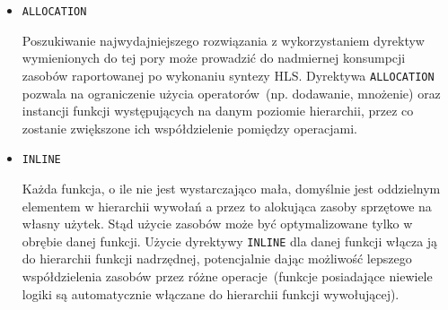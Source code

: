 \begin{itemize}
\begin{lstlisting}[caption=Ilustracja problemu związanego z wykrywaniem zależności przez Vivado HLS i wpływu na wydajność]
while(true)
{
#pragma HLS PIPELINE
	...
	switch(inst)
	{
		case ADD:
			reg = reg + 1;
			break;
		case NEG:
			reg = -reg;
			break;
		case SQRT:
			reg = sqrt(reg);
			break;
		default:
			break;
	}
}
\end{lstlisting}
W powyższym przykładzie HLS dokonując analizy zależności pomiędzy wykorzystaniem \texttt{reg} założy konserwatywnie, że interwał przetwarzania instrukcji będzie określony poprzez instrukcję wykonującą się najdłużej~(tutaj jest to funkcja \texttt{sqrt()}), gdyż tylko wtedy istnieje pewność, że moduł będzie wykonywał się w sposób poprawny. Prowadzi to do sytuacji, że nawet instrukcja pusta~(realizowana przez \texttt{default}) będzie wykonywana tak długo jak \texttt{sqrt()}, co w jawny sposób ogranicza szybkość przetwarzania. Dyrektywa \texttt{DEPENDENCE} w założeniu pozwoli wymusić, by rozważanie zależności zostało w przypadku zmiennej \texttt{reg} pominięte\footnote{Stosując tę dyrektywę należy mieć pewność, że nie narusza to integralności algorytmu albo projektant jest w stanie poradzić sobie z ubocznymi konsekwencjami jej użycia.}.

\item \texttt{ALLOCATION}

Poszukiwanie najwydajniejszego rozwiązania z wykorzystaniem dyrektyw wymienionych do tej pory może prowadzić do nadmiernej konsumpcji zasobów raportowanej po wykonaniu syntezy HLS. Dyrektywa \texttt{ALLOCATION} pozwala na ograniczenie użycia operatorów~(np. dodawanie, mnożenie) oraz instancji funkcji występujących na danym poziomie hierarchii, przez co zostanie zwiększone ich współdzielenie pomiędzy operacjami.

\item \texttt{INLINE}

Każda funkcja, o ile nie jest wystarczająco mała, domyślnie jest oddzielnym elementem w hierarchii wywołań a przez to alokująca zasoby sprzętowe na własny użytek.  Stąd użycie zasobów może być optymalizowane tylko w obrębie danej funkcji. Użycie dyrektywy \texttt{INLINE} dla danej funkcji włącza ją do hierarchii funkcji nadrzędnej, potencjalnie dając możliwość lepszego współdzielenia zasobów przez różne operacje~(funkcje posiadające niewiele logiki są automatycznie włączane do hierarchii funkcji wywołującej).

\end{itemize}
